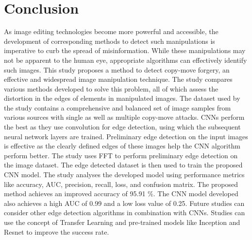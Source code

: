 \documentclass[conference]{IEEEtran}
\begin{document}
\section{Conclusion}
As image editing technologies become more powerful and accessible, the development of corresponding methods to detect such manipulations is imperative to curb the spread of misinformation. While these manipulations may not be apparent to the human eye, appropriate algorithms can effectively identify such images. This study proposes a method to detect copy-move forgery, an effective and widespread image manipulation technique. The study compares various methods developed to solve this problem, all of which assess the distortion in the edges of elements in manipulated images. The dataset used by the study contains a comprehensive and balanced set of image samples from various sources with single as well as multiple copy-move attacks. CNNs perform the best as they use convolution for edge detection, using which the subsequent neural network layers are trained. Preliminary edge detection on the input images is effective as the clearly defined edges of these images help the CNN algorithm perform better. The study uses FFT to perform preliminary edge detection on the image dataset. The edge detected dataset is then used to train the proposed CNN model. The study analyses the developed model using performance metrics like accuracy, AUC, precision, recall, loss, and confusion matrix. The proposed method achieves an improved accuracy of 95.91 \%. The CNN model developed also achieves a high AUC of 0.99 and a low loss value of 0.25. Future studies can consider other edge detection algorithms in combination with CNNs. Studies can use the concept of Transfer Learning and pre-trained models like Inception and Resnet to improve the success rate. 

\end{document}
